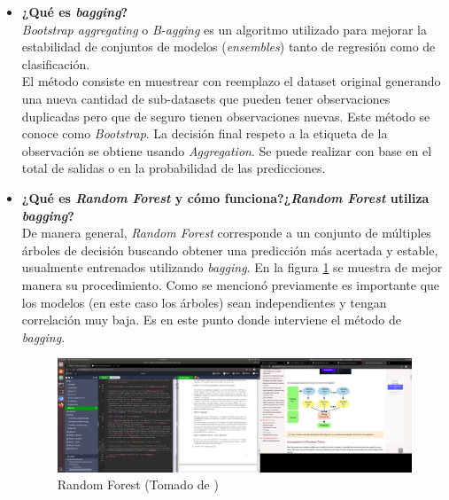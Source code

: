 \begin{itemize}
    \item \textbf{¿Qué es \textit{bagging}?}\\
    
    \textit{Bootstrap aggregating} o \textit{B-agging} es un algoritmo utilizado para mejorar la estabilidad de conjuntos de modelos (\textit{ensembles}) tanto de regresión como de clasificación.\\
    El método consiste en muestrear con reemplazo el dataset original generando una nueva cantidad de sub-datasets que pueden tener observaciones duplicadas pero que de seguro tienen observaciones nuevas. Este método se conoce como \textit{Bootstrap}. La decisión final respeto a la etiqueta de la observación se obtiene usando \textit{Aggregation}. Se puede realizar con base en el total de salidas o en la probabilidad de las predicciones.
    
    \item \textbf{¿Qué es \textit{Random Forest} y cómo funciona?¿\textit{Random Forest} utiliza \textit{bagging}?}\\
    
    De manera general, \textit{Random Forest} corresponde a un conjunto de múltiples árboles de decisión buscando obtener una predicción más acertada y estable, usualmente entrenados utilizando \textit{bagging}. En la figura \ref{fig:RF} se muestra de mejor manera su procedimiento. Como se mencionó previamente es importante que los modelos (en este caso los árboles) sean independientes y tengan correlación muy baja. Es en este punto donde interviene el método de \textit{bagging}.\\
    
    \begin{figure}[H]
        \centering
        \includegraphics[trim={77cm 15cm 20cm 9cm}, clip, scale = 0.5]{doc/images/randomrofest.png}
        \caption{Random Forest (Tomado de \cite{javatpoint})}
        \label{fig:RF}
    \end{figure}
    

\end{itemize}
